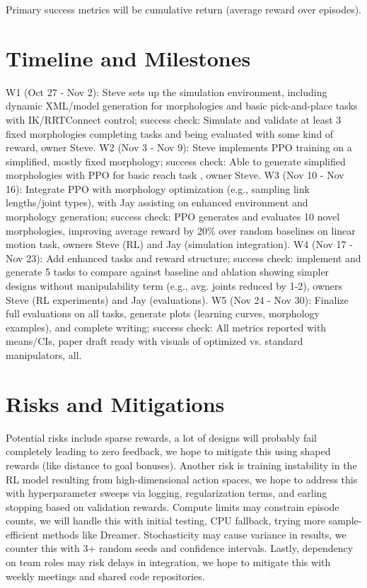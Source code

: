 \documentclass[conference]{IEEEtran}
\begin{document}
Primary success metrics will be cumulative return (average reward over episodes).

\section{Timeline and Milestones}
W1 (Oct 27 - Nov 2): Steve sets up the simulation environment, including dynamic XML/model generation for morphologies and basic pick-and-place tasks with IK/RRTConnect control; success check: Simulate and validate at least 3 fixed morphologies completing tasks and being evaluated with some kind of reward, owner Steve.
W2 (Nov 3 - Nov 9): Steve implements PPO training on a simplified, mostly fixed morphology; success check: Able to generate simplified morphologies with PPO for basic reach task , owner Steve.
W3 (Nov 10 - Nov 16): Integrate PPO with morphology optimization (e.g., sampling link lengths/joint types), with Jay assisting on enhanced environment and morphology generation; success check: PPO generates and evaluates 10 novel morphologies, improving average reward by 20\% over random baselines on linear motion task, owners Steve (RL) and Jay (simulation integration).
W4 (Nov 17 - Nov 23): Add enhanced tasks and reward structure; success check: implement and generate 5 tasks to compare against baseline and ablation showing simpler designs without manipulability term (e.g., avg. joints reduced by 1-2), owners Steve (RL experiments) and Jay (evaluations).
W5 (Nov 24 - Nov 30): Finalize full evaluations on all tasks, generate plots (learning curves, morphology examples), and complete writing; success check: All metrics reported with means/CIs, paper draft ready with visuals of optimized vs. standard manipulators, all.

\section{Risks and Mitigations}
Potential risks include sparse rewards, a lot of designs will probably fail completely leading to zero feedback, we hope to mitigate this using shaped rewards (like distance to goal bonuses).
Another risk is training instability in the RL model resulting from high-dimensional action spaces, we hope to address this with hyperparameter sweeps via logging, regularization terms, and earling stopping based on validation rewards.
Compute limits may constrain episode counts, we will handle this with initial testing, CPU fallback, trying more sample-efficient methods like Dreamer.
Stochasticity may cause variance in results, we counter this with 3+ random seeds and confidence intervals.
Lastly, dependency on team roles may risk delays in integration, we hope to mitigate this with weekly meetings and shared code repositories.
\end{document}
